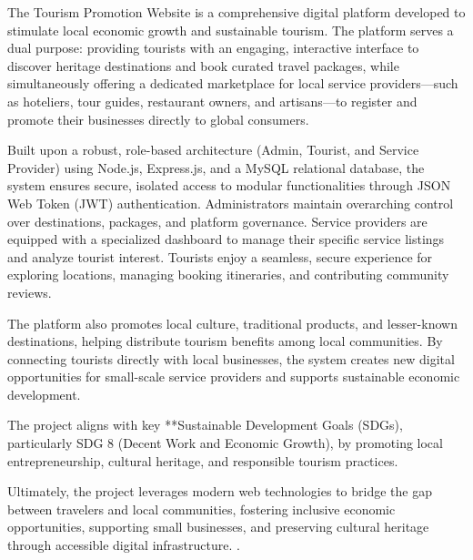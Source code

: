 \documentclass[12pt,a4paper]{report}
\begin{document}
The Tourism Promotion Website is a comprehensive digital platform developed to stimulate local economic growth and sustainable tourism. The platform serves a dual purpose: providing tourists with an engaging, interactive interface to discover heritage destinations and book curated travel packages, while simultaneously offering a dedicated marketplace for local service providers—such as hoteliers, tour guides, restaurant owners, and artisans—to register and promote their businesses directly to global consumers.

Built upon a robust, role-based architecture (Admin, Tourist, and Service Provider) using Node.js, Express.js, and a MySQL relational database, the system ensures secure, isolated access to modular functionalities through JSON Web Token (JWT) authentication. Administrators maintain overarching control over destinations, packages, and platform governance. Service providers are equipped with a specialized dashboard to manage their specific service listings and analyze tourist interest. Tourists enjoy a seamless, secure experience for exploring locations, managing booking itineraries, and contributing community reviews.

The platform also promotes local culture, traditional products, and lesser-known destinations, helping distribute tourism benefits among local communities. By connecting tourists directly with local businesses, the system creates new digital opportunities for small-scale service providers and supports sustainable economic development.

The project aligns with key **Sustainable Development Goals (SDGs), particularly SDG 8 (Decent Work and Economic Growth),  by promoting local entrepreneurship, cultural heritage, and responsible tourism practices.

Ultimately, the project leverages modern web technologies to bridge the gap between travelers and local communities, fostering inclusive economic opportunities, supporting small businesses, and preserving cultural heritage through accessible digital infrastructure.
.

\clearpage
{} %
\pagestyle{empty} %
\tableofcontents

\clearpage

\pagestyle{maincontent} %












\end{document}
